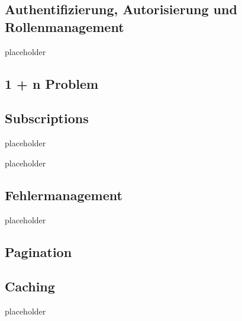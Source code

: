 \subsection{Authentifizierung, Autorisierung und Rollenmanagement}

placeholder
\pagebreak

\subsection{1 + n Problem}

\subsection{Subscriptions}

placeholder
\pagebreak

placeholder
\pagebreak

\subsection{Fehlermanagement}

placeholder
\pagebreak

\subsection{Pagination}

\subsection{Caching}

placeholder
\pagebreak
